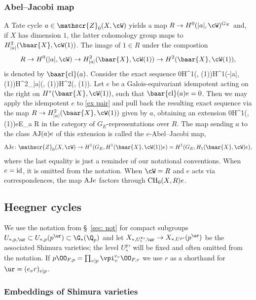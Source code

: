 \subsubsection{Abel--Jacobi map}  A Tate cycle $a\in \mathscr{Z}_{0}(X, \cW)$ yields a map $R\to H^{0}(|a|, \cW)^{G_{E}}$ and, if $X$ has dimension $1$, the latter cohomology group maps to $H^{2}_{|a|}(\baar{X}, \cW(1))
$. The image of $1\in R$ under the compostion
$$R\to H^{0}(|a|, \cW)\to H^{2}_{|a|}(\baar{X}, \cW(1))\to H^{2}(\baar{X}, \cW(1)),$$ is denoted by $\baar{\rm cl}(a)$.
Consider the exact sequence
\beq\label{ex pair}
0\to H^{1}(, \cW(1))\to H^{1}(-|a|, \cW(1))\to H^{2}_{|a|}(, \cW(1))\to H^{2}(, \cW(1)).
\eeq
 Let $e$ be a Galois-equivariant idempotent acting on the right on $H^{*}(\baar{X}, \cW(1) )$, such that $\baar{\rm cl}(a)e=0$. Then we may apply the idempotent $e$ to \eqref{ex pair} and pull back the resulting exact sequence via the map $R\to H^{2}_{|a|}(\baar{X}, \cW(1))$ given by $a$, obtaining an extension
\beq \label{AJ extn}
0\to H^{1}(, \cW(1))e\to E_{a} \to R
\eeq
in the category of $G_{E}$-representations over $R$.  The map sending $a$ to the class ${\rm AJ}(a)e$ of this extension is called the $e$-Abel--Jacobi map,
$${\rm AJ}e\colon \mathscr{Z}_{0}(X, \cW)\to H^{1}(G_{E}, H^{1}(\baar{X}, \cW(1))e)=  H^{1}(G_{E}, H_{1}(\baar{X}, \cW)e),$$
where the last equality is just a reminder of our notational conventions.  When $e={\rm id}$, it is omitted from the notation.
When  $\cW=R$ and $e$ acts via correspondences, the map ${\rm AJ}e$ factors through ${\rm CH}_{0}(X, R)e$.








\subsection{Heegner cycles}
We use the notation from \S~\ref{sec: not} for compact subgroups $U_{*,p, \ur}\subset  U_{*,p}(p^{\ur})\subset \G_{*}(\Q_{p})$ and let $X_{*, U^{p}_{*}{}',\ur}\rightarrow X_{*, U^{p}{}'}(p^{\ur})$ be the associated Shimura varieties; the level $U_{*}^{p}{}'$ will be fixed
 and often omitted from the notation. If $p\OO_{F,p}=\prod_{v\vert p }\vpi_{v}^{e_{v}}\OO_{F, v}$ we use  $r$ as a shorthand for  $\ur=(e_{v}r)_{v\vert p}$.


\subsubsection{Embeddings of Shimura varieties}

